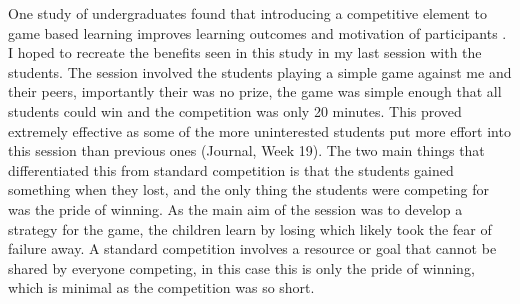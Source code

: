 \documentclass[11pt, a4paper, notitlepage]{article}
\begin{document}
One study of undergraduates found that introducing a competitive element to game based learning improves learning outcomes and motivation of participants \cite{Cagiltay:2015}. I hoped to recreate the benefits seen in this study in my last session with the students. The session involved the students playing a simple game against me and their peers, importantly their was no prize, the game was simple enough that all students could win and the competition was only 20 minutes. This proved extremely effective as some of the more uninterested students put more effort into this session than previous ones (Journal, Week 19). The two main things that differentiated this from standard competition is that the students gained something when they lost, and the only thing the students were competing for was the pride of winning. As the main aim of the session was to develop a strategy for the game, the children learn by losing which likely took the fear of failure away. A standard competition involves a resource or goal that cannot be shared by everyone competing, in this case this is only the pride of winning, which is minimal as the competition was so short.
\par
\end{document}
